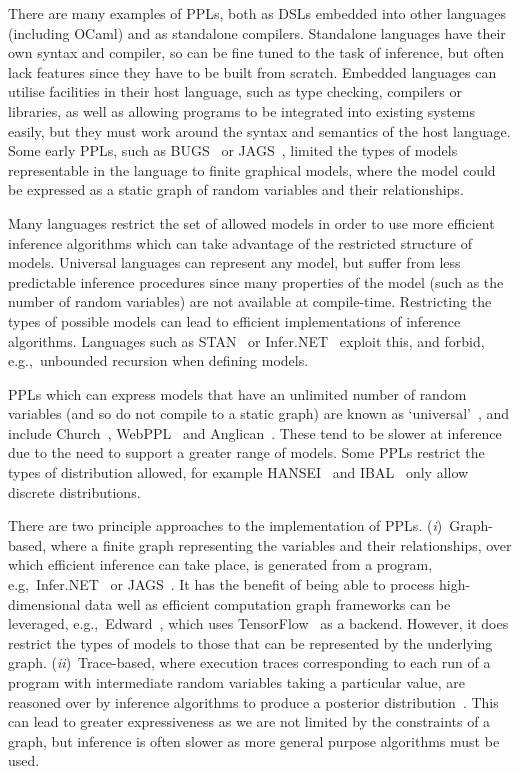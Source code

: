 \documentclass[sigconf]{acmart}
\newcommand{\one}{({\em i})\/}
\newcommand{\two}{({\em ii})\/}
\begin{document}
There are many examples of PPLs, both as DSLs embedded into other languages (including OCaml) and as standalone compilers. Standalone languages have their own syntax and compiler, so can be fine tuned to the task of inference, but often lack features since they have to be built from scratch. Embedded languages can utilise facilities in their host language, such as type checking, compilers or libraries, as well as allowing programs to be integrated into existing systems easily, but they must work around the syntax and semantics of the host language. Some early PPLs, such as BUGS~\cite{gilks1994bugs} or JAGS~\cite{plummer2004jags}, limited the types of models representable in the language to finite graphical models, where the model could be expressed as a static graph of random variables and their relationships.

Many languages restrict the set of allowed models in order to use more efficient inference algorithms which can take advantage of the restricted structure of models. Universal languages can represent any model, but suffer from less predictable inference procedures since many properties of the model (such as the number of random variables) are not available at compile-time. Restricting the types of possible models can lead to efficient implementations of inference algorithms. Languages such as STAN~\cite{carpenter2017stan} or Infer.NET~\cite{wang2011using} exploit this, and forbid, e.g.,~unbounded recursion when defining models.

PPLs which can express models that have an unlimited number of random variables (and so do not compile to a static graph) are known as `universal'~\cite{borgstrom2016lambda}, and include Church~\cite{goodman2012church}, WebPPL~\cite{mobus2018structure} and Anglican~\cite{anglican-smc}. These tend to be slower at inference due to the need to support a greater range of models. Some PPLs restrict the types of distribution allowed, for example HANSEI~\cite{kiselyov2009embedded} and IBAL~\cite{ibal} only allow discrete distributions.

There are two principle approaches to the implementation of PPLs. \one~Graph-based, where a finite graph representing the variables and their relationships, over which efficient inference can take place, is generated from a program, e.g,~Infer.NET~\cite{wang2011using} or JAGS~\cite{plummer2004jags}. It has the benefit of being able to process high-dimensional data well as efficient computation graph frameworks can be leveraged, e.g.,~Edward~\cite{edward}, which uses TensorFlow~\cite{tensorflow} as a backend. However, it does restrict the types of models to those that can be represented by the underlying graph. \two~Trace-based, where execution traces corresponding to each run of a program with intermediate random variables taking a particular value, are reasoned over by inference algorithms to produce a posterior distribution~\cite{anglican-smc,mobus2018structure}. This can lead to greater expressiveness as we are not limited by the constraints of a graph, but inference is often slower as more general purpose algorithms must be used.
\end{document}
